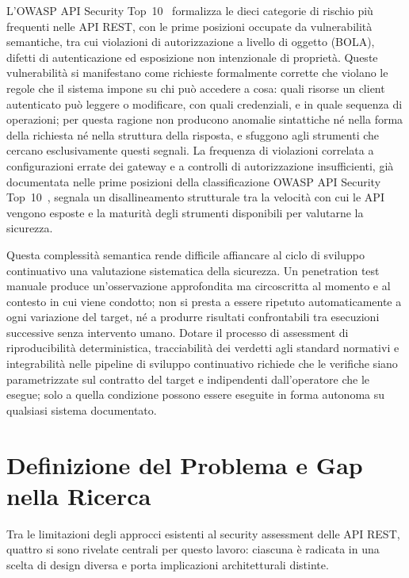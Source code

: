 L'\gls{OWASP} API Security Top~10~\cite{OWASPTop10}
formalizza le dieci categorie di rischio più frequenti nelle \gls{API} REST, con le prime posizioni occupate da vulnerabilità semantiche, tra cui violazioni di autorizzazione a livello di oggetto (\gls{BOLA}), difetti di autenticazione ed esposizione non intenzionale di proprietà. Queste vulnerabilità si manifestano come richieste formalmente corrette che violano le regole che il sistema impone su chi può accedere a cosa: quali risorse un client autenticato può leggere o modificare, con quali credenziali, e in quale sequenza di operazioni; per questa ragione non producono anomalie sintattiche né nella forma della richiesta né nella struttura della risposta, e sfuggono agli strumenti che cercano esclusivamente questi segnali.
La frequenza di violazioni correlata a configurazioni errate dei gateway e a controlli di autorizzazione insufficienti, già documentata nelle prime posizioni della classificazione \gls{OWASP} API Security Top~10~\cite{OWASPTop10}, segnala un disallineamento strutturale tra la velocità con cui le \gls{API} vengono esposte e la maturità degli strumenti disponibili per valutarne la sicurezza.

Questa complessità semantica rende difficile affiancare al ciclo di sviluppo continuativo una valutazione sistematica della sicurezza. Un penetration test manuale produce un'osservazione approfondita ma circoscritta al momento e al contesto in cui viene condotto; non si presta a essere ripetuto automaticamente a ogni variazione del target, né a produrre risultati confrontabili tra esecuzioni successive senza intervento umano. Dotare il processo di assessment di riproducibilità deterministica, tracciabilità dei verdetti agli standard normativi e integrabilità nelle pipeline di sviluppo continuativo richiede che le verifiche siano parametrizzate sul contratto del target e indipendenti dall'operatore che le esegue; solo a quella condizione possono essere eseguite in forma autonoma su qualsiasi sistema documentato.


\section{Definizione del Problema e Gap nella Ricerca}\label{sec:gap-ricerca}

Tra le limitazioni degli approcci esistenti al security assessment delle \gls{API} REST, quattro si sono rivelate centrali per questo lavoro: ciascuna è radicata in una scelta di design diversa e porta implicazioni architetturali distinte.

